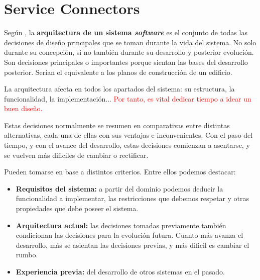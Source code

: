 \chapter{Service Connectors}

Según \cite{taylorSoftwareArchitectureFoundations2009}, la {\bf arquitectura de un sistema \textit{software}} es el conjunto de todas las decisiones de diseño principales que se toman durante la vida del sistema. No solo durante su concepción, si no también durante su desarrollo y posterior evolución. Son decisiones principales o importantes porque sientan las bases del desarrollo posterior. Serían el equivalente a los planos de construcción de un edificio.

La arquitectura afecta en todos los apartados del sistema: su estructura, la funcionalidad, la implementación... \textcolor{red}{Por tanto, es vital dedicar tiempo a idear un buen diseño.}

Estas decisiones normalmente se resumen en comparativas entre distintas alternativas, cada una de ellas con sus ventajas e inconvenientes. Con el paso del tiempo, y con el avance del desarrollo, estas decisiones comienzan a asentarse, y se vuelven más dificiles de cambiar o rectificar.

Pueden tomarse en base a distintos criterios. Entre ellos podemos destacar:

    \begin{itemize}
        \item \textbf{Requisitos del sistema:} a partir del dominio podemos deducir la funcionalidad a implementar, las restricciones que debemos respetar y otras propiedades que debe poseer el sistema.
        \item \textbf{Arquitectura actual:} las decisiones tomadas previamente también condicionan las decisiones para la evolución futura. Cuanto más avanza el desarrollo, más se asientan las decisiones previas, y más dificil es cambiar el rumbo.
        \item \textbf{Experiencia previa:} del desarrollo de otros sistemas en el pasado.
    \end{itemize}


